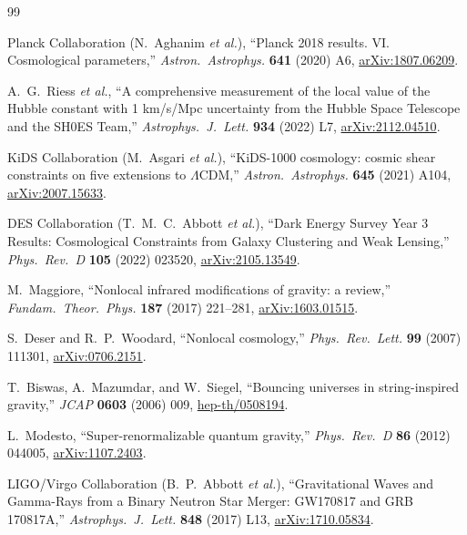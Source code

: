 \documentclass[11pt,a4paper]{article}
\theoremstyle{plain}
\theoremstyle{definition}
\begin{document}
\begin{thebibliography}{99}

Planck Collaboration (N.~Aghanim \textit{et al.}),
``Planck 2018 results. VI. Cosmological parameters,''
\emph{Astron.\ Astrophys.} \textbf{641} (2020) A6,
\href{https://arxiv.org/abs/1807.06209}{arXiv:1807.06209}.

A.~G.~Riess \textit{et al.},
``A comprehensive measurement of the local value of the Hubble constant
with 1 km/s/Mpc uncertainty from the Hubble Space Telescope and the
SH0ES Team,''
\emph{Astrophys.\ J.\ Lett.} \textbf{934} (2022) L7,
\href{https://arxiv.org/abs/2112.04510}{arXiv:2112.04510}.

KiDS Collaboration (M.~Asgari \textit{et al.}),
``KiDS-1000 cosmology: cosmic shear constraints on five extensions to
$\Lambda$CDM,''
\emph{Astron.\ Astrophys.} \textbf{645} (2021) A104,
\href{https://arxiv.org/abs/2007.15633}{arXiv:2007.15633}.

DES Collaboration (T.~M.~C.~Abbott \textit{et al.}),
``Dark Energy Survey Year 3 Results: Cosmological Constraints from
Galaxy Clustering and Weak Lensing,''
\emph{Phys.\ Rev.\ D} \textbf{105} (2022) 023520,
\href{https://arxiv.org/abs/2105.13549}{arXiv:2105.13549}.

M.~Maggiore,
``Nonlocal infrared modifications of gravity: a review,''
\emph{Fundam.\ Theor.\ Phys.} \textbf{187} (2017) 221--281,
\href{https://arxiv.org/abs/1603.01515}{arXiv:1603.01515}.

S.~Deser and R.~P.~Woodard,
``Nonlocal cosmology,''
\emph{Phys.\ Rev.\ Lett.} \textbf{99} (2007) 111301,
\href{https://arxiv.org/abs/0706.2151}{arXiv:0706.2151}.

T.~Biswas, A.~Mazumdar, and W.~Siegel,
``Bouncing universes in string-inspired gravity,''
\emph{JCAP} \textbf{0603} (2006) 009,
\href{https://arxiv.org/abs/hep-th/0508194}{hep-th/0508194}.

L.~Modesto,
``Super-renormalizable quantum gravity,''
\emph{Phys.\ Rev.\ D} \textbf{86} (2012) 044005,
\href{https://arxiv.org/abs/1107.2403}{arXiv:1107.2403}.

LIGO/Virgo Collaboration (B.~P.~Abbott \textit{et al.}),
``Gravitational Waves and Gamma-Rays from a Binary Neutron Star Merger:
GW170817 and GRB 170817A,''
\emph{Astrophys.\ J.\ Lett.} \textbf{848} (2017) L13,
\href{https://arxiv.org/abs/1710.05834}{arXiv:1710.05834}.


\end{thebibliography}
\end{document}
